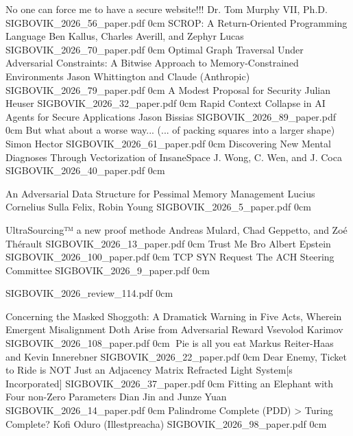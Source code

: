 \addpaper
	{No one can force me to have a secure website!!!}
	{Dr. Tom Murphy VII, Ph.D.}
	{}
	{SIGBOVIK_2026_56_paper.pdf}
	{0cm}
	{}
\addpaper
	{SCROP: A Return-Oriented Programming Language}
	{Ben Kallus, Charles Averill, and Zephyr Lucas}
	{}
	{SIGBOVIK_2026_70_paper.pdf}
	{0cm}
	{}
\addpaper
	{Optimal Graph Traversal Under Adversarial Constraints: A Bitwise Approach to Memory-Constrained Environments}
	{Jason Whittington and Claude (Anthropic)}
	{}
	{SIGBOVIK_2026_79_paper.pdf}
	{0cm}
	{}
\addpaper
	{A Modest Proposal for Security}
	{Julian Heuser}
	{}
	{SIGBOVIK_2026_32_paper.pdf}
	{0cm}
	{}
\addpaper
	{Rapid Context Collapse in AI Agents for Secure Applications}
	{Jason Bissias}
	{}
	{SIGBOVIK_2026_89_paper.pdf}
	{0cm}
	{}
\addpaper
	{But what about a worse way... (... of packing squares into a larger shape)}
	{Simon Hector}
	{}
	{SIGBOVIK_2026_61_paper.pdf}
	{0cm}
	{}
\addpaper
	{Discovering New Mental Diagnoses Through Vectorization of InsaneSpace}
	{J. Wong, C. Wen, and J. Coca}
	{}
	{SIGBOVIK_2026_40_paper.pdf}
	{0cm}
	{}

\addpaper
	{An Adversarial Data Structure for Pessimal Memory Management}
	{Lucius Cornelius Sulla Felix, Robin Young}
	{}
	{SIGBOVIK_2026_5_paper.pdf}
	{0cm}
	{}




\addpaper
	{UltraSourcing™ a new proof methode}
	{Andreas Mulard, Chad Geppetto, and Zoé Thérault}
	{}
	{SIGBOVIK_2026_13_paper.pdf}
	{0cm}
	{}
\addpaper
	{Trust Me Bro}
	{Albert Epstein}
	{}
	{SIGBOVIK_2026_100_paper.pdf}
	{0cm}
	{}
\addpaper
	{TCP SYN Request}
	{The ACH Steering Committee}
	{}
	{SIGBOVIK_2026_9_paper.pdf}
	{0cm}
	{}

\addreview
	{SIGBOVIK_2026_review_114.pdf}
	{0cm}

\addpaper
	{Concerning the Masked Shoggoth: A Dramatick Warning in Five Acts, Wherein Emergent Misalignment Doth Arise from Adversarial Reward}
	{Vsevolod Karimov}
	{}
	{SIGBOVIK_2026_108_paper.pdf}
	{0cm}
	{}
\addpaper
	{🥧Pie is all you eat}
	{Markus Reiter-Haas and Kevin Innerebner}
	{}
	{SIGBOVIK_2026_22_paper.pdf}
	{0cm}
	{}
\addpaper
	{Dear Enemy, Ticket to Ride is NOT Just an Adjacency Matrix}
	{Refracted Light System[s Incorporated]}
	{}
	{SIGBOVIK_2026_37_paper.pdf}
	{0cm}
	{}
\addpaper
	{Fitting an Elephant with Four non-Zero Parameters}
	{Dian Jin and Junze Yuan}
	{}
	{SIGBOVIK_2026_14_paper.pdf}
	{0cm}
	{}
\addpaper
	{Palindrome Complete (PDD) > Turing Complete?}
	{Kofi Oduro (Illestpreacha)}
	{}
	{SIGBOVIK_2026_98_paper.pdf}
	{0cm}
	{}
